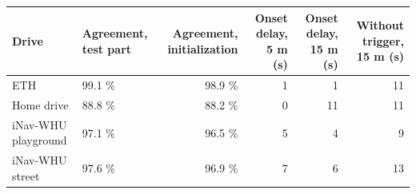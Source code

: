 \begin{tabular}{llrrrr}
\toprule
Drive & Agreement, test part & Agreement, initialization & Onset delay, 5 m (s) & Onset delay, 15 m (s) & Without trigger, 15 m (s) \\
\midrule
ETH & 99.1 \% & 98.9 \% & 1 & 1 & 11 \\
Home drive & 88.8 \% & 88.2 \% & 0 & 11 & 11 \\
iNav-WHU playground & 97.1 \% & 96.5 \% & 5 & 4 & 9 \\
iNav-WHU street & 97.6 \% & 96.9 \% & 7 & 6 & 13 \\
\bottomrule
\end{tabular}
